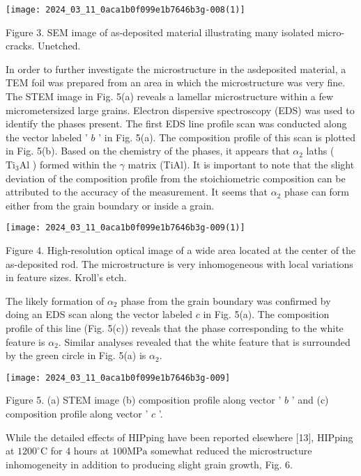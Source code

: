 \documentclass[10pt]{article}
\begin{document}
\begin{center}
\texttt{[image: 2024\_03\_11\_0aca1b0f099e1b7646b3g-008(1)]}
\end{center}

Figure 3. SEM image of as-deposited material illustrating many isolated micro-cracks. Unetched.

In order to further investigate the microstructure in the asdeposited material, a TEM foil was prepared from an area in which the microstructure was very fine. The STEM image in Fig. 5(a) reveals a lamellar microstructure within a few micrometersized large grains. Electron dispersive spectroscopy (EDS) was used to identify the phases present. The first EDS line profile scan was conducted along the vector labeled ' $b$ ' in Fig. 5(a). The composition profile of this scan is plotted in Fig. 5(b). Based on the chemistry of the phases, it appears that $\alpha_{2}$ laths ( $\mathrm{Ti}_{3} \mathrm{Al}$ ) formed within the $\gamma$ matrix (TiAl). It is important to note that the slight deviation of the composition profile from the stoichiometric composition can be attributed to the accuracy of the measurement. It seems that $\alpha_{2}$ phase can form either from the grain boundary or inside a grain.

\begin{center}
\texttt{[image: 2024\_03\_11\_0aca1b0f099e1b7646b3g-009(1)]}
\end{center}

Figure 4. High-resolution optical image of a wide area located at the center of the as-deposited rod. The microstructure is very inhomogeneous with local variations in feature sizes. Kroll's etch.

The likely formation of $\alpha_{2}$ phase from the grain boundary was confirmed by doing an EDS scan along the vector labeled $c$ in Fig. 5(a). The composition profile of this line (Fig. 5(c)) reveals that the phase corresponding to the white feature is $\alpha_{2}$. Similar analyses revealed that the white feature that is surrounded by the green circle in Fig. 5(a) is $\alpha_{2}$.

\begin{center}
\texttt{[image: 2024\_03\_11\_0aca1b0f099e1b7646b3g-009]}
\end{center}

Figure 5. (a) STEM image (b) composition profile along vector ' $b$ ' and (c) composition profile along vector ' $c$ '.

While the detailed effects of HIPping have been reported elsewhere [13], HIPping at $1200^{\circ} \mathrm{C}$ for 4 hours at $100 \mathrm{MPa}$ somewhat reduced the microstructure inhomogeneity in addition to producing slight grain growth, Fig. 6.
\end{document}
